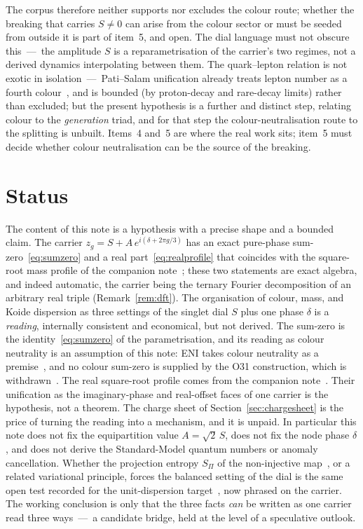\documentclass[11pt]{article}
\theoremstyle{definition}
\theoremstyle{remark}
\newcommand{\SPi}{S_{\Pi}}
\begin{document}
    The corpus therefore neither supports nor excludes the colour route; whether the breaking that carries
    $S \neq 0$ can arise from the colour sector or must be seeded from outside it is part of item~5, and open.
    The dial language must not obscure this~---~the amplitude $S$ is a reparametrisation of the carrier's two
    regimes, not a derived dynamics interpolating between them.
    The quark--lepton relation is not exotic in isolation~---~Pati--Salam unification already treats lepton number
    as a fourth colour~\cite{PatiSalam1974}, and is bounded (by proton-decay and rare-decay limits) rather than
    excluded; but the present
    hypothesis is a further and distinct step, relating colour to the \emph{generation} triad, and for that step the
    colour-neutralisation route to the splitting is unbuilt.
    Items~4 and~5 are where the real work sits; item~5 must decide whether colour neutralisation can be the source
    of the breaking.

  \section{Status}
    \label{sec:status}

    The content of this note is a hypothesis with a precise shape and a bounded claim.
    The carrier $z_g = S + A\,e^{i(\delta + 2\pi g/3)}$ has an exact pure-phase sum-zero~\eqref{eq:sumzero} and a
    real part~\eqref{eq:realprofile} that coincides with the square-root mass profile of the companion
    note~\cite{Beau2026kud}; these two statements are exact algebra, and indeed automatic, the carrier being the
    ternary Fourier decomposition of an arbitrary real triple (Remark~\ref{rem:dft}).
    The organisation of colour, mass, and Koide dispersion as three settings of the singlet dial $S$ plus one
    phase $\delta$ is a \emph{reading}, internally consistent and economical, but not derived.
    The sum-zero is the identity~\eqref{eq:sumzero} of the parametrisation, and its reading as colour neutrality is
    an assumption of this note: ENI takes colour neutrality as a premise~\cite{Beau2026l}, and no colour sum-zero is
    supplied by the O31 construction, which is withdrawn~\cite{Beau2026a35}.
    The real square-root profile comes from the companion note~\cite{Beau2026kud}.
    Their unification as the imaginary-phase and real-offset faces of one carrier is the hypothesis, not a theorem.
    The charge sheet of Section~\ref{sec:chargesheet} is the price of turning the reading into a mechanism, and it
    is unpaid.
    In particular this note does not fix the equipartition value $A = \sqrt2\,S$, does not fix the node phase
    $\delta$, and does not derive the Standard-Model quantum numbers or anomaly cancellation.
    Whether the projection entropy $\SPi$ of the non-injective map~\cite{Beau2026l}, or a related variational
    principle, forces the balanced setting of the dial is the same open test recorded for the unit-dispersion
    target~\cite{Beau2026kud}, now phrased on the carrier.
    The working conclusion is only that the three facts \emph{can} be written as one carrier read three ways~---~a
    candidate bridge, held at the level of a speculative outlook.

  \newpage

  
  
\end{document}
